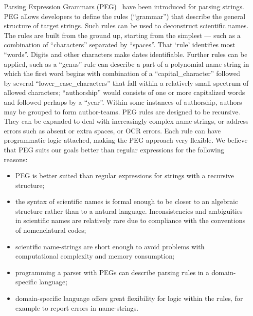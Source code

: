\documentclass{bmcart}
\begin{document}
Parsing Expression Grammars (PEG)~\cite{Ford2004} have been introduced for parsing strings. PEG allows developers to define the rules (``grammar'') that describe the general structure of target strings. Such rules can be used to deconstruct scientific names. The rules are built from the ground up, starting from the simplest --- such as a combination of ``characters'' separated by ``spaces''. That `rule' identifies most ``words''. Digits and other characters make dates identifiable.  Further rules can be applied, such as a ``genus'' rule can describe a part of a polynomial name-string in which the first word begins with combination of a ``capital\_character'' followed by several ``lower\_case\_characters'' that fall within a relatively small spectrum of allowed characters; ``authorship'' would consists of one or more capitalized words and followed perhaps by a ``year''. Within some instances of authorship,  authors may be grouped to form author-teams. PEG rules are designed to be recursive. They can be expanded to deal with increasingly complex name-strings, or address errors such as absent or extra spaces, or OCR errors. Each rule can have programmatic logic attached, making the PEG approach very flexible. We believe that PEG suits our goals better than regular expressions for the following reasons:

\begin{itemize}

  \item PEG is better suited than regular expressions for strings with a recursive structure;

  \item the syntax of scientific names is formal enough to be closer to an algebraic structure rather than to a natural language. Inconsistencies and ambiguities in scientific names are relatively rare due to compliance with the conventions of nomenclatural codes;

  \item scientific name-strings are short enough to avoid problems with computational complexity and memory consumption;

  \item programming a parser with PEGs can describe parsing rules in a domain-specific language;

  \item domain-specific language offers great flexibility for logic within the rules, for example to report errors in name-strings.

\end{itemize}
\end{document}
